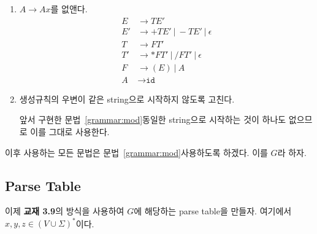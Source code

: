\documentclass[a4paper,10pt]{scrartcl}
\numberwithin{equation}{section}
\numberwithin{figure}{section}
\numberwithin{table}{section}
\theoremstyle{definition}
\begin{document}
\begin{enumerate}
  \item $A \to Ax$를 없앤다.
        \begin{equation}\label{grammar:mod}
          \begin{aligned}
            E  & \to TE'                        \\
            E' & \to +TE'\ |\ -TE'\ |\ \epsilon \\
            T  & \to FT'                        \\
            T' & \to *FT'\ |\ /FT'\ |\ \epsilon \\
            F  & \to (E)\ |\ A                  \\
            A  & \to \texttt{id}
          \end{aligned}
        \end{equation}
  \item 생성규칙의 우변이 같은 string으로 시작하지 않도록 고친다.

        앞서 구현한 문법~\ref{grammar:mod}\은 동일한 string으로 시작하는 것이 하나도 없으므로 이를 그대로 사용한다.
\end{enumerate}

이후 사용하는 모든 문법은 문법~\ref{grammar:mod}\을 사용하도록 하겠다. 이를 $G$라 하자.

\subsection{Parse Table}
\label{subsec:parsetable}

이제 \textbf{교재 3.9}의 방식을 사용하여 $G$에 해당하는 parse table을 만들자. 여기에서 $x, y, z \in (V \cup \Sigma)^*$이다.
\end{document}
